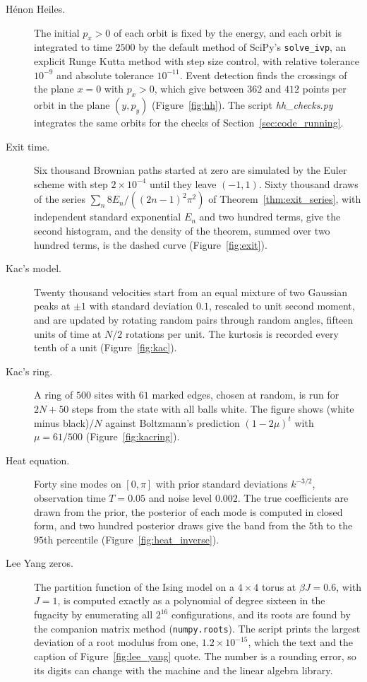 \begin{description}
\item[H\'enon Heiles.] The initial $p_x>0$ of each orbit is fixed by the energy, and each orbit is integrated to time $2500$ by the default method of SciPy's \texttt{solve\_ivp}, an explicit Runge Kutta method with step size control, with relative tolerance $10^{-9}$ and absolute tolerance $10^{-11}$. Event detection finds the crossings of the plane $x=0$ with $p_x>0$, which give between $362$ and $412$ points per orbit in the plane $(y,p_y)$ (Figure~\ref{fig:hh}). The script \textit{hh\_checks.py} integrates the same orbits for the checks of Section~\ref{sec:code_running}.
\item[Exit time.] Six thousand Brownian paths started at zero are simulated by the Euler scheme with step $2\times10^{-4}$ until they leave $(-1,1)$. Sixty thousand draws of the series $\sum_n8E_n/((2n-1)^2\pi^2)$ of Theorem~\ref{thm:exit_series}, with independent standard exponential $E_n$ and two hundred terms, give the second histogram, and the density of the theorem, summed over two hundred terms, is the dashed curve (Figure~\ref{fig:exit}).
\item[Kac's model.] Twenty thousand velocities start from an equal mixture of two Gaussian peaks at $\pm1$ with standard deviation $0.1$, rescaled to unit second moment, and are updated by rotating random pairs through random angles, fifteen units of time at $N/2$ rotations per unit. The kurtosis is recorded every tenth of a unit (Figure~\ref{fig:kac}).
\item[Kac's ring.] A ring of $500$ sites with $61$ marked edges, chosen at random, is run for $2N+50$ steps from the state with all balls white. The figure shows (white minus black)$/N$ against Boltzmann's prediction $(1-2\mu)^t$ with $\mu=61/500$ (Figure~\ref{fig:kacring}).
\item[Heat equation.] Forty sine modes on $[0,\pi]$ with prior standard deviations $k^{-3/2}$, observation time $T=0.05$ and noise level $0.002$. The true coefficients are drawn from the prior, the posterior of each mode is computed in closed form, and two hundred posterior draws give the band from the $5$th to the $95$th percentile (Figure~\ref{fig:heat_inverse}).
\item[Lee Yang zeros.] The partition function of the Ising model on a $4\times4$ torus at $\beta J=0.6$, with $J=1$, is computed exactly as a polynomial of degree sixteen in the fugacity by enumerating all $2^{16}$ configurations, and its roots are found by the companion matrix method (\texttt{numpy.roots}). The script prints the largest deviation of a root modulus from one, $1.2\times10^{-15}$, which the text and the caption of Figure~\ref{fig:lee_yang} quote. The number is a rounding error, so its digits can change with the machine and the linear algebra library.

\end{description}

